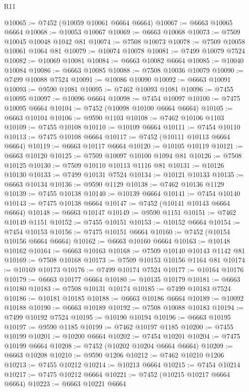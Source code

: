 \begin{lexlean}{R11}
\begin{coremodule}
{{{{{{{{{{{{{{{{{{{{{{{{{{{{{{{{{{{{{{{{{{{{{{{{{{{{{{{{{{{{{{{{{{{{{{{{{{{{{{{{{{@10065 := @7452 (@10059 @10061 @6664 @6664)
@10067 := @6663 @10065 @6664
@10068 := @10053 @10067
@10069 := @6663 @10068
@10073 := @7509 @10045 @10048 @1042 @81
@10074 := @7508 @10073
@10078 := @7509 @10058 @10061 @1064 @81
@10079 := @10074 @10078
@10081 := @7499 @10079 @7524
@10082 := @10069 @10081
@10084 := @6663 @10082 @6664
@10085 := @10040 @10084
@10086 := @6663 @10085
@10088 := @7508 @10036 @10079
@10090 := @7499 @10088 @7524
@10091 := @10086 @10090
@10092 := @6663 @10091
@10093 := @9590 @1081
@10095 := @7462 @10093 @1081
@10096 := @7455 @10095
@10097 := @10096 @6664
@10098 := @7454 @10097
@10100 := @7475 @10095 @6664
@10104 := @7452 (@10098 @10100 @6664 @6664)
@10105 := @6663 @10104
@10106 := @9590 @1103
@10108 := @7462 @10106 @1103
@10109 := @7455 @10108
@10110 := @10109 @6664
@10111 := @7454 @10110
@10113 := @7475 @10108 @6664
@10117 := @7452 (@10111 @10113 @6664 @6664)
@10119 := @6663 @10117 @6664
@10120 := @10105 @10119
@10121 := @6663 @10120
@10125 := @7509 @10097 @10100 @1094 @81
@10126 := @7508 @10125
@10130 := @7509 @10110 @10113 @1116 @81
@10131 := @10126 @10130
@10133 := @7499 @10131 @7524
@10134 := @10121 @10133
@10135 := @6663 @10134
@10136 := @9590 @1129
@10138 := @7462 @10136 @1129
@10139 := @7455 @10138
@10140 := @10139 @6664
@10141 := @7454 @10140
@10143 := @7475 @10138 @6664
@10147 := @7452 (@10141 @10143 @6664 @6664)
@10148 := @6663 @10147
@10149 := @9590 @1151
@10151 := @7462 @10149 @1151
@10152 := @7455 @10151
@10153 := @10152 @6664
@10154 := @7454 @10153
@10156 := @7475 @10151 @6664
@10160 := @7452 (@10154 @10156 @6664 @6664)
@10162 := @6663 @10160 @6664
@10163 := @10148 @10162
@10164 := @6663 @10163
@10168 := @7509 @10140 @10143 @1142 @81
@10169 := @7508 @10168
@10173 := @7509 @10153 @10156 @1164 @81
@10174 := @10169 @10173
@10176 := @7499 @10174 @7524
@10177 := @10164 @10176
@10179 := @6663 @10177 @6664
@10180 := @10135 @10179
@10181 := @6663 @10180
@10183 := @7508 @10131 @10174
@10185 := @7499 @10183 @7524
@10186 := @10181 @10185
@10188 := @6663 @10186 @6664
@10189 := @10092 @10188
@10190 := @6663 @10189
@10192 := @7508 @10088 @10183
@10194 := @7499 @10192 @7524
@10195 := @10190 @10194
@10196 := @6663 @10195
@10197 := @9590 @1185
@10199 := @7462 @10197 @1185
@10200 := @7455 @10199
@10201 := @10200 @6664
@10202 := @7454 @10201
@10204 := @7475 @10199 @6664
@10208 := @7452 (@10202 @10204 @6664 @6664)
@10209 := @6663 @10208
@10210 := @9590 @1206
@10212 := @7462 @10210 @1206
@10213 := @7455 @10212
@10214 := @10213 @6664
@10215 := @7454 @10214
@10217 := @7475 @10212 @6664
@10221 := @7452 (@10215 @10217 @6664 @6664)
@10223 := @6663 @10221 @6664
}}}}}}}}}}}}}}}}}}}}}}}}}}}}}}}}}}}}}}}}}}}}}}}}}}}}}}}}}}}}}}}}}}}}}}}}}}}}}}}}}}
\end{coremodule}
\end{lexlean}
